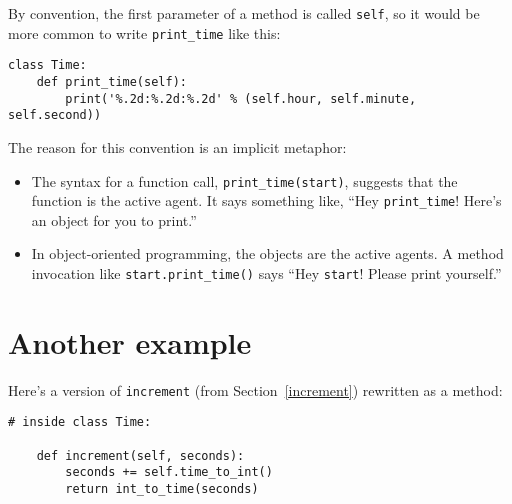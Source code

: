 By convention, the first parameter of a method is
called {\tt self}, so it would be more common to write
\verb"print_time" like this:

\begin{lstlisting}
class Time:
    def print_time(self):
        print('%.2d:%.2d:%.2d' % (self.hour, self.minute, self.second))
\end{lstlisting}

%
The reason for this convention is an implicit metaphor:

\begin{itemize}

\item The syntax for a function call, \verb"print_time(start)",
  suggests that the function is the active agent.  It says something
  like, ``Hey \verb"print_time"!  Here's an object for you to print.''

\item In object-oriented programming, the objects are the active
  agents.  A method invocation like \verb"start.print_time()" says
  ``Hey {\tt start}!  Please print yourself.''

\end{itemize}



\section{Another example}

Here's a version of {\tt increment} (from Section~\ref{increment})
rewritten as a method:

\begin{lstlisting}
# inside class Time:

    def increment(self, seconds):
        seconds += self.time_to_int()
        return int_to_time(seconds)
\end{lstlisting}

